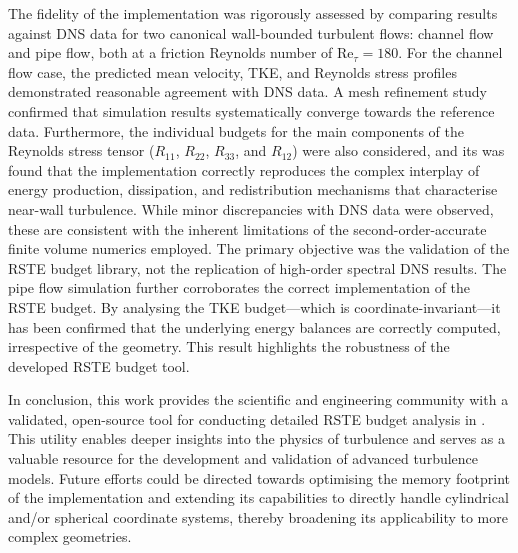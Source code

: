 The fidelity of the implementation was rigorously assessed by comparing results against DNS data for two canonical wall-bounded turbulent flows: channel flow and pipe flow, both at a friction Reynolds number of Re$_{\tau}=180$. For the channel flow case, the predicted mean velocity, TKE, and Reynolds stress profiles demonstrated reasonable agreement with DNS data. A mesh refinement study confirmed that simulation results systematically converge towards the reference data. Furthermore, the individual budgets for the main components of the Reynolds stress tensor ($R_{11}$, $R_{22}$, $R_{33}$, and $R_{12}$) were also considered, and its was found that the implementation correctly reproduces the complex interplay of energy production, dissipation, and redistribution mechanisms that characterise near-wall turbulence. While minor discrepancies with DNS data were observed, these are consistent with the inherent limitations of the second-order-accurate finite volume numerics employed. The primary objective was the validation of the RSTE budget library, not the replication of high-order spectral DNS results.
The pipe flow simulation further corroborates the correct implementation of the RSTE budget. By analysing the TKE budget---which is coordinate-invariant---it has been confirmed that the underlying energy balances are correctly computed, irrespective of the geometry. This result highlights the robustness of the developed RSTE budget tool.

In conclusion, this work provides the scientific and engineering community with a validated, open-source tool for conducting detailed RSTE budget analysis in \OF. This utility enables deeper insights into the physics of turbulence and serves as a valuable resource for the development and validation of advanced turbulence models. Future efforts could be directed towards optimising the memory footprint of the implementation and extending its capabilities to directly handle cylindrical and/or spherical coordinate systems, thereby broadening its applicability to more complex geometries.
